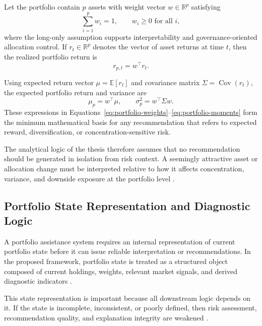 \documentclass[11pt]{article}
\begin{document}
Let the portfolio contain $p$ assets with weight vector $w \in \mathbb{R}^{p}$ satisfying
\begin{equation}
\label{eq:portfolio-weights}
\sum_{i=1}^{p} w_i = 1, \qquad w_i \ge 0 \text{ for all } i,
\end{equation}
where the long-only assumption supports interpretability and governance-oriented allocation control. If $r_t \in \mathbb{R}^{p}$ denotes the vector of asset returns at time $t$, then the realized portfolio return is
\begin{equation}
\label{eq:portfolio-return}
r_{p,t} = w^{\top} r_t.
\end{equation}

Using expected return vector $\mu = \mathbb{E}[r_t]$ and covariance matrix $\Sigma = \operatorname{Cov}(r_t)$, the expected portfolio return and variance are
\begin{equation}
\label{eq:portfolio-moments}
\mu_p = w^{\top} \mu, \qquad \sigma_p^2 = w^{\top} \Sigma w.
\end{equation}
These expressions in Equations~\eqref{eq:portfolio-weights}--\eqref{eq:portfolio-moments} form the minimum mathematical basis for any recommendation that refers to expected reward, diversification, or concentration-sensitive risk.

The analytical logic of the thesis therefore assumes that no recommendation should be generated in isolation from risk context. A seemingly attractive asset or allocation change must be interpreted relative to how it affects concentration, variance, and downside exposure at the portfolio level \cite{longin2001,rockafellar2000}.

\subsection{Portfolio State Representation and Diagnostic Logic}
A portfolio assistance system requires an internal representation of current portfolio state before it can issue reliable interpretation or recommendations. In the proposed framework, portfolio state is treated as a structured object composed of current holdings, weights, relevant market signals, and derived diagnostic indicators \cite{peralta2016,onnela2003}.

This state representation is important because all downstream logic depends on it. If the state is incomplete, inconsistent, or poorly defined, then risk assessment, recommendation quality, and explanation integrity are weakened \cite{adadi2018,white2000}.
\end{document}
